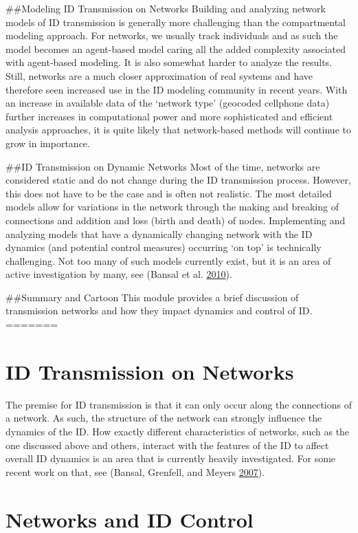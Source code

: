 \documentclass[]{book}
\theoremstyle{definition}
\theoremstyle{definition}
\theoremstyle{definition}
\theoremstyle{remark}
\begin{document}
\#\#Modeling ID Transmission on Networks Building and analyzing network
models of ID transmission is generally more challenging than the
compartmental modeling approach. For networks, we usually track
individuals and as such the model becomes an agent-based model caring
all the added complexity associated with agent-based modeling. It is
also somewhat harder to analyze the results. Still, networks are a much
closer approximation of real systems and have therefore seen increased
use in the ID modeling community in recent years. With an increase in
available data of the `network type' (geocoded cellphone data) further
increases in computational power and more sophisticated and efficient
analysis approaches, it is quite likely that network-based methods will
continue to grow in importance.

\#\#ID Transmission on Dynamic Networks Most of the time, networks are
considered static and do not change during the ID transmission process.
However, this does not have to be the case and is often not realistic.
The most detailed models allow for variations in the network through the
making and breaking of connections and addition and loss (birth and
death) of nodes. Implementing and analyzing models that have a
dynamically changing network with the ID dynamics (and potential control
measures) occurring `on top' is technically challenging. Not too many of
such models currently exist, but it is an area of active investigation
by many, see (Bansal et al. \protect\hyperlink{ref-bansal10}{2010}).

\#\#Summary and Cartoon This module provides a brief discussion of
transmission networks and how they impact dynamics and control of ID.
=======
\section{ID Transmission on Networks}\label{id-transmission-on-networks}

The premise for ID transmission is that it can only occur along the
connections of a network. As such, the structure of the network can
strongly influence the dynamics of the ID. How exactly different
characteristics of networks, such as the one discussed above and others,
interact with the features of the ID to affect overall ID dynamics is an
area that is currently heavily investigated. For some recent work on
that, see (Bansal, Grenfell, and Meyers
\protect\hyperlink{ref-bansal07}{2007}).

\section{Networks and ID Control}\label{networks-and-id-control}
\end{document}
